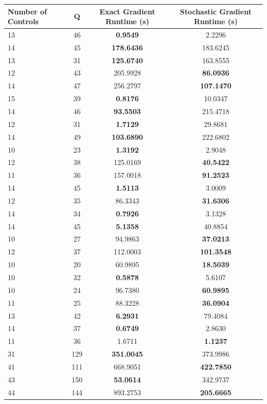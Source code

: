 \documentclass{article}
\begin{document}
\begin{table}[h]
\centering
\begin{tabular}{lccc}
\toprule
Number of Controls & Q & Exact Gradient Runtime (s) & Stochastic Gradient Runtime (s) \\
\midrule
13 & 46 & \textbf{0.9549} & 2.2296 \\
14 & 45 & \textbf{178.6436} & 183.6245 \\
13 & 31 & \textbf{125.6740} & 163.8555 \\
12 & 43 & 205.9928 & \textbf{86.0936} \\
14 & 47 & 256.2797 & \textbf{107.1470} \\
15 & 39 & \textbf{0.8176} & 10.0347 \\
14 & 46 & \textbf{93.5503} & 215.4718 \\
12 & 31 & \textbf{1.7129} & 29.8681 \\
14 & 49 & \textbf{103.6890} & 222.6802 \\
10 & 23 & \textbf{1.3192} & 2.9048 \\
12 & 38 & 125.0169 & \textbf{40.5422} \\
11 & 36 & 157.0018 & \textbf{91.2523} \\
14 & 45 & \textbf{1.5113} & 3.0009 \\
12 & 35 & 86.3343 & \textbf{31.6306} \\
14 & 34 & \textbf{0.7926} & 3.1328 \\
14 & 45 & \textbf{5.1358} & 40.8854 \\
10 & 27 & 94.9863 & \textbf{37.0213} \\
12 & 37 & 112.0003 & \textbf{101.3548} \\
10 & 20 & 60.9895 & \textbf{18.5039} \\
10 & 32 & \textbf{0.5878} & 5.6107 \\
10 & 24 & 96.7380 & \textbf{60.9895} \\
11 & 25 & 88.3228 & \textbf{36.0904} \\
13 & 42 & \textbf{6.2931} & 79.4084 \\
14 & 37 & \textbf{0.6749} & 2.8630 \\
11 & 36 & 1.6711 & \textbf{1.1237} \\
31 & 129 & \textbf{351.0045} & 373.9986 \\
41 & 111 & 668.9051 & \textbf{422.7850} \\
43 & 150 & \textbf{53.0614} & 342.9737 \\
44 & 144 & 893.2753 & \textbf{205.6665} \\

\end{tabular}
\end{table}
\end{document}
